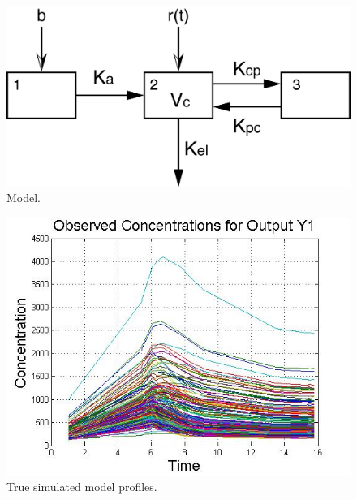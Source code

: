 

%
%
\begin{figure}[hbtp] %
\centering
\includegraphics[scale=0.45, bb=0 0 1282 670]{figModel.png}
\caption{Model.
}
\label{Fig:Model}
\end{figure}


%
%
\begin{figure}[ht] %
     \centering
        \includegraphics[width=0.65\linewidth, bb =0 0 603 452]{figRunBigObservedConcentrations.jpg}
        \caption{True simulated model profiles.}
        \label{Fig:Spaghetti}
\end{figure}

